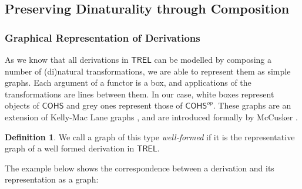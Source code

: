 \documentclass[11pt, oneside]{article}
\theoremstyle{plain}
\theoremstyle{definition}
\newtheorem{definition}[theorem]{Definition}
\newcommand{\sSys}{{\mathsf{TREL}}}%
\newcommand{\cohs}{{\mathsf{COHS}}}
\begin{document}
\subsection{Preserving Dinaturality through Composition}

\subsubsection{Graphical Representation of Derivations}
As we know that all derivations in $\sSys$ can be modelled by composing a number of (di)natural transformations, we are able to represent them as simple graphs.
Each argument of a functor is a box, and applications of the transformations are lines between them.
In our case, white boxes represent objects of $\cohs$ and grey ones represent those of $\cohs^{op}$.
These graphs are an extension of Kelly-Mac Lane graphs \cite{mac2013categories}, and are introduced formally by McCusker \cite{mccusker2018compositionality}.

\begin{definition}
We call a graph of this type \textit{well-formed} if it is the representative graph of a well formed derivation in $\sSys$.
\end{definition}
The example below shows the correspondence between a derivation and its representation as a graph:
\end{document}
